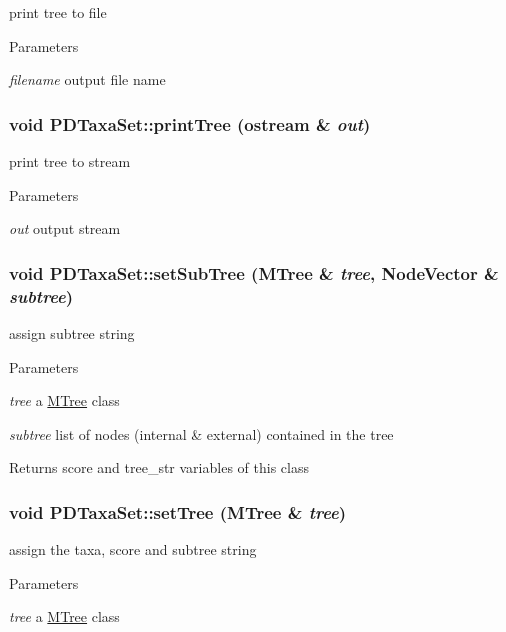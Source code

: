 \label{classPDTaxaSet_a602f719dcbdaccbe9e39c7c984419262}
print tree to file 
\begin{DoxyParams}{Parameters}
\item[{\em filename}]output file name \end{DoxyParams}
\hypertarget{classPDTaxaSet_a0984e1dde694d35ebbbeef292d29a182}{
\subsubsection[{printTree}]{\setlength{\rightskip}{0pt plus 5cm}void PDTaxaSet::printTree (ostream \& {\em out})}}
\label{classPDTaxaSet_a0984e1dde694d35ebbbeef292d29a182}
print tree to stream 
\begin{DoxyParams}{Parameters}
\item[{\em out}]output stream \end{DoxyParams}
\hypertarget{classPDTaxaSet_aaec7e5e2824f3b853cfc95c9b66658d3}{
\subsubsection[{setSubTree}]{\setlength{\rightskip}{0pt plus 5cm}void PDTaxaSet::setSubTree ({\bf MTree} \& {\em tree}, \/  NodeVector \& {\em subtree})}}
\label{classPDTaxaSet_aaec7e5e2824f3b853cfc95c9b66658d3}
assign subtree string 
\begin{DoxyParams}{Parameters}
\item[{\em tree}]a \hyperlink{classMTree}{MTree} class \item[{\em subtree}]list of nodes (internal \& external) contained in the tree \end{DoxyParams}
\begin{DoxyReturn}{Returns}
score and tree\_\-str variables of this class 
\end{DoxyReturn}
\hypertarget{classPDTaxaSet_aa025792b1112c59c6335da02133cd1d5}{
\subsubsection[{setTree}]{\setlength{\rightskip}{0pt plus 5cm}void PDTaxaSet::setTree ({\bf MTree} \& {\em tree})}}
\label{classPDTaxaSet_aa025792b1112c59c6335da02133cd1d5}
assign the taxa, score and subtree string 
\begin{DoxyParams}{Parameters}
\item[{\em tree}]a \hyperlink{classMTree}{MTree} class \end{DoxyParams}


